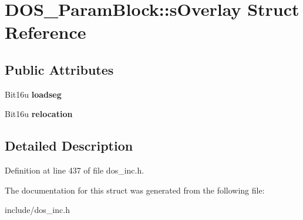 \hypertarget{structDOS__ParamBlock_1_1sOverlay}{\section{D\-O\-S\-\_\-\-Param\-Block\-:\-:s\-Overlay Struct Reference}
\label{structDOS__ParamBlock_1_1sOverlay}
}
\subsection*{Public Attributes}
\begin{DoxyCompactItemize}
\item 
\hypertarget{structDOS__ParamBlock_1_1sOverlay_a6aa3b07fbae37d952b116773e87712cc}{Bit16u {\bfseries loadseg}}\label{structDOS__ParamBlock_1_1sOverlay_a6aa3b07fbae37d952b116773e87712cc}

\item 
\hypertarget{structDOS__ParamBlock_1_1sOverlay_a1fec335c736328ce8eb8096a2df9ccc6}{Bit16u {\bfseries relocation}}\label{structDOS__ParamBlock_1_1sOverlay_a1fec335c736328ce8eb8096a2df9ccc6}

\end{DoxyCompactItemize}


\subsection{Detailed Description}


Definition at line 437 of file dos\-\_\-inc.\-h.



The documentation for this struct was generated from the following file\-:\begin{DoxyCompactItemize}
\item 
include/dos\-\_\-inc.\-h\end{DoxyCompactItemize}
